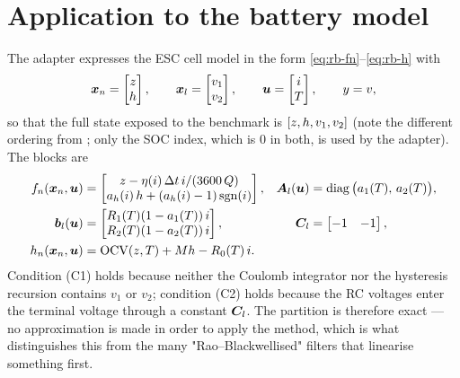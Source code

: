 \section{Application to the battery model}
\label{sec:rb-battery}
The adapter  expresses the ESC cell model in the form
\eqref{eq:rb-fn}--\eqref{eq:rb-h} with
\begin{equation}
  \bm{x}_n = \begin{bmatrix}z\\ h\end{bmatrix}, \qquad
  \bm{x}_l = \begin{bmatrix}v_1\\ v_2\end{bmatrix}, \qquad
  \bm{u} = \begin{bmatrix}i\\ T\end{bmatrix}, \qquad y = v ,
  \label{eq:rb-partition}
\end{equation}
so that the full state exposed to the benchmark is $[z, h, v_1, v_2]$ (note the different
ordering from ; only the SOC index, which is $0$ in both, is used by the adapter).
The blocks are
\begin{align}
  f_n(\bm{x}_n,\bm{u}) &= \begin{bmatrix}
      z - \eta(i)\,\Delta t\, i/(3600\,Q) \\
      a_h(i)\,h + (a_h(i)-1)\operatorname{sgn}(i) \end{bmatrix}, &
  \bm{A}_l(\bm{u}) &= \operatorname{diag}\big(a_1(T),\, a_2(T)\big), \label{eq:rb-ecm-f}\\
  \bm b_l(\bm{u}) &= \begin{bmatrix} R_1(T)(1-a_1(T))\,i \\ R_2(T)(1-a_2(T))\,i\end{bmatrix}, &
  \bm{C}_l &= \begin{bmatrix}-1 & -1\end{bmatrix}, \label{eq:rb-ecm-l}\\
  h_n(\bm{x}_n,\bm{u}) &= \mathrm{OCV}(z, T) + M h - R_0(T)\, i . &&
  \label{eq:rb-ecm-h}
\end{align}
Condition (C1) holds because neither the Coulomb integrator nor the hysteresis recursion contains
$v_1$ or $v_2$; condition (C2) holds because the RC voltages enter the terminal voltage through a
constant $\bm{C}_l$.  The partition is therefore exact --- no approximation is made in order to apply
the method, which is what distinguishes this from the many "Rao--Blackwellised" filters that
linearise something first.

